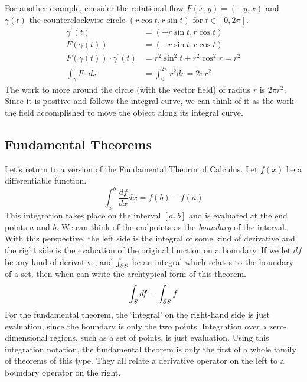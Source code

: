 \documentclass[fleqn,letterpaper]{report}
\begin{document}
\begin{example}
For another example, consider the rotational flow $F(x,y) =
(-y,x)$ and $\gamma(t)$ the counterclockwise circle $(r \cos
t, r \sin t)$ for $t \in [0, 2\pi]$. 
\begin{align*}
\gamma^\prime(t) & = (-r \sin t, r \cos t) \\
F(\gamma(t)) & = (-r\sin t, r \cos t) \\
F(\gamma(t)) \cdot \gamma^\prime(t) & = r^2 \sin^2 t + r^2
\cos^2 r = r^2 \\
\int_{\gamma} F \cdot ds & = \int_0^{2\pi} r^2 dr = 2\pi r^2
\end{align*}
The work to more around the circle (with the vector field) of
radius $r$ is $2\pi r^2$. Since it is positive and follows
the integral curve, we can think of it as the work the
field accomplished to move the object along its integral
curve.
\end{example}

\subsection{Fundamental Theorems}
\label{fundamental-theorems}

Let's return to a version of the Fundamental Theorm of Calculus. 
Let $f(x)$ be a differentiable function.
\begin{equation*}
\int_a^b \frac{df}{dx} dx = f(b) - f(a)
\end{equation*}
This integration takes place on the interval $[a,b]$ and is
evaluated at the end points $a$ and $b$. We can think of the
endpoints as the \emph{boundary} of the interval. With this
perspective, the left side is the integral of some kind of
derivative and the right side is the evaluation of the
original function on a boundary. If we let $df$ be any kind of
derivative, and $\int_{\partial S}$ be an integral which relates
to the boundary of a set, then when can write the archtypical
form of this theorem.
\begin{equation*}
\int_S df = \int_{\partial S} f
\end{equation*}
For the fundamental theorem, the `integral' on the right-hand
side is just evaluation, since the boundary is only the two
points. Integration over a zero-dimensional regions, such as
a set of points, is just evaluation. Using this integration
notation, the fundamental theorem is only the first of a whole
family of theorems of this type. They all relate a derivative
operator on the left to a boundary operator on the right. 
\end{document}
